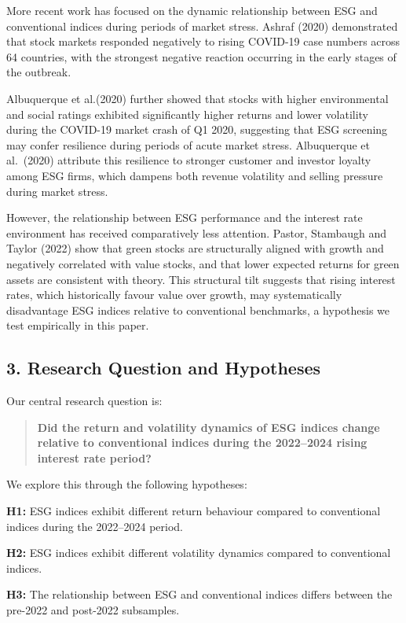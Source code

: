 \documentclass[
]{article}
\begin{document}
More recent work has focused on the dynamic relationship between ESG and
conventional indices during periods of market stress. Ashraf (2020)
demonstrated that stock markets responded negatively to rising COVID-19
case numbers across 64 countries, with the strongest negative reaction
occurring in the early stages of the outbreak.

Albuquerque et al.(2020) further showed that stocks with higher
environmental and social ratings exhibited significantly higher returns
and lower volatility during the COVID-19 market crash of Q1 2020,
suggesting that ESG screening may confer resilience during periods of
acute market stress. Albuquerque et al.~(2020) attribute this resilience
to stronger customer and investor loyalty among ESG firms, which dampens
both revenue volatility and selling pressure during market stress.

However, the relationship between ESG performance and the interest rate
environment has received comparatively less attention. Pastor, Stambaugh
and Taylor (2022) show that green stocks are structurally aligned with
growth and negatively correlated with value stocks, and that lower
expected returns for green assets are consistent with theory. This
structural tilt suggests that rising interest rates, which historically
favour value over growth, may systematically disadvantage ESG indices
relative to conventional benchmarks, a hypothesis we test empirically in
this paper.

\subsection{3. Research Question and
Hypotheses}\label{research-question-and-hypotheses}

Our central research question is:

\begin{quote}
\textbf{Did the return and volatility dynamics of ESG indices change
relative to conventional indices during the 2022--2024 rising interest
rate period?}
\end{quote}

We explore this through the following hypotheses:

\textbf{H1:} ESG indices exhibit different return behaviour compared to
conventional indices during the 2022--2024 period.

\textbf{H2:} ESG indices exhibit different volatility dynamics compared
to conventional indices.

\textbf{H3:} The relationship between ESG and conventional indices
differs between the pre-2022 and post-2022 subsamples.
\end{document}
